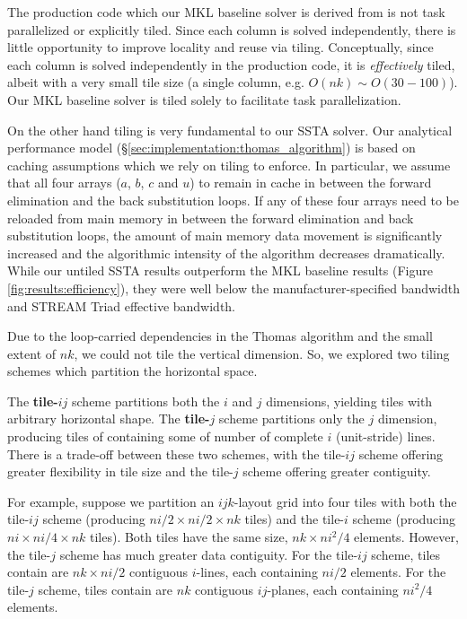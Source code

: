 \documentclass{sig-alternate-05-2015}
\begin{document}
The production code which our MKL baseline solver is derived from is not task
  parallelized or explicitly tiled.
Since each column is solved independently, there is little opportunity to improve
  locality and reuse via tiling.
Conceptually, since each column is solved independently in the production code,
  it is \emph{effectively} tiled, albeit with a very small tile size (a single
  column, e.g. \(O(nk) \sim O(30-100)\)).
Our MKL baseline solver is tiled solely to facilitate task parallelization.

On the other hand tiling is very fundamental to our SSTA solver.
Our analytical performance model (\S\ref{sec:implementation:thomas_algorithm})
  is based on caching assumptions which we rely on tiling to enforce.
In particular, we assume that all four arrays (\(a\), \(b\), \(c\) and \(u\))
  to remain in cache in between the forward elimination and the back substitution
  loops.
If any of these four arrays need to be reloaded from main memory in between the
  forward elimination and back substitution loops, the amount of main memory data
  movement is significantly increased and the algorithmic intensity of the
  algorithm decreases dramatically.
While our untiled SSTA results outperform the MKL baseline results (Figure
  \ref{fig:results:efficiency}), they were well below the manufacturer-specified
  bandwidth and STREAM Triad effective bandwidth.

Due to the loop-carried dependencies in the Thomas algorithm and the small
  extent of \(nk\), we could not tile the vertical dimension. So, we explored two
  tiling schemes which partition the horizontal space.

The \textbf{tile-\(ij\)} scheme partitions both the \(i\) and \(j\) dimensions,
  yielding tiles with arbitrary horizontal shape. 
The \textbf{tile-\(j\)} scheme partitions only the \(j\) dimension, producing
  tiles of containing some of number of complete \(i\) (unit-stride) lines.
There is a trade-off between these two schemes, with the tile-\(ij\) scheme
  offering greater flexibility in tile size and the tile-\(j\) scheme offering
  greater contiguity. 

For example, suppose we partition an \(ijk\)-layout grid into four tiles with
  both the tile-\(ij\) scheme (producing \(ni/2 \times ni/2 \times nk\) tiles)
  and the tile-\(i\) scheme (producing \(ni \times ni/4 \times nk\) tiles).
Both tiles have the same size, \(nk \times ni^2/4\) elements.
However, the tile-\(j\) scheme has much greater data contiguity.
For the tile-\(ij\) scheme, tiles contain are \(nk \times ni/2\) contiguous
  \(i\)-lines, each containing \(ni/2\) elements.
For the tile-\(j\) scheme, tiles contain are \(nk\) contiguous \(ij\)-planes,
  each containing \(ni^2/4\) elements.
\end{document}
